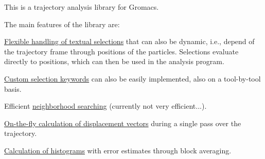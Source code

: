 \-This is a trajectory analysis library for \-Gromacs.

\-The main features of the library are\-:
\begin{DoxyItemize}
\item \hyperlink{selengine}{\-Flexible handling of textual selections} that can also be dynamic, i.\-e., depend of the trajectory frame through positions of the particles. \-Selections evaluate directly to positions, which can then be used in the analysis program.
\item \hyperlink{selmethods}{\-Custom selection keywords} can also be easily implemented, also on a tool-\/by-\/tool basis.
\item \-Efficient \hyperlink{nbsearch}{neighborhood searching} (currently not very efficient...).
\item \hyperlink{displacements}{\-On-\/the-\/fly calculation of displacement vectors} during a single pass over the trajectory.
\item \hyperlink{histograms}{\-Calculation of histograms} with error estimates through block averaging.
\end{DoxyItemize}

